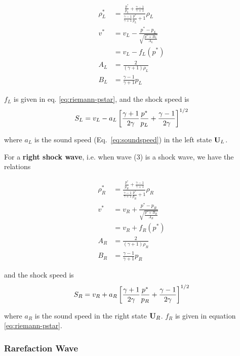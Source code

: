 \begin{align*}
\rho^*_L &=
	\frac{\frac{p^*}{p_L} + \frac{\gamma - 1}{\gamma+1}}
	{\frac{\gamma - 1}{\gamma+1} \frac{p^*}{p_L} + 1}
	\rho_L \\
v^* &=
	v_L - \frac{p^* - p_L}{\sqrt{\frac{p^* + B_L}{A_L}}}\\
	& = v_L - f_L(p^*) \\
A_L &=
	\frac{2}{(\gamma + 1) \rho_L}\\
B_L &=
	\frac{\gamma - 1}{\gamma + 1} p_L
\end{align*}

$f_{L}$ is given in eq. \ref{eq:riemann-pstar}, and the shock speed is
\begin{align*}
S_L = v_L - a_L \left[\frac{\gamma + 1}{2 \gamma} \frac{p^*}{p_L} +
	\frac{\gamma - 1}{2\gamma} \right]^{1/2}
\end{align*}

where $a_L$ is the sound speed (Eq.~\ref{eq:soundspeed}) in the left state
$\mathbf{U}_L$.



For a \textbf{right shock wave}, i.e. when wave (3) is a shock wave, we have
the relations


\begin{align*}
\rho^*_R &=
	\frac{\frac{p^*}{p_R} + \frac{\gamma - 1}{\gamma+1}}
		{\frac{\gamma - 1}{\gamma+1} \frac{p^*}{p_R} + 1}
	\rho_R \\
v^* &=
	v_R + \frac{p^* - p_R}{\sqrt{\frac{p^* + B_R}{A_R}}}\\
	& = v_R + f_R(p^*) \\
A_R &=
	\frac{2}{(\gamma + 1) \rho_R}\\
B_R &=
	\frac{\gamma - 1}{\gamma + 1} p_R
\end{align*}

and the shock speed is
\begin{align*}
S_R = v_R + a_R \left[\frac{\gamma + 1}{2 \gamma} \frac{p^*}{p_R} +
	\frac{\gamma - 1}{2\gamma} \right]^{1/2}
\end{align*}

where $a_R$ is the sound speed in the right state $\mathbf{U}_R$. $f_R$ is given in
equation \ref{eq:riemann-pstar}.








\subsubsection{Rarefaction Wave}

